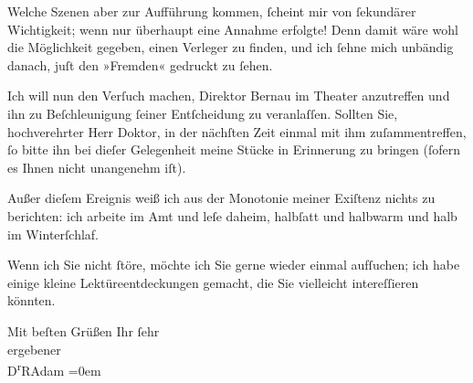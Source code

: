 \pstart
           Welche Szenen aber zur Aufführung kommen,{ }ſcheint mir von{ }ſekundärer Wichtigkeit;
               wenn nur überhaupt eine Annahme erfolgte! Denn damit wäre wohl die Möglichkeit
               gegeben, einen Verleger zu finden, und ich{ }ſehne mich unbändig danach, juſt den »Fremden« gedruckt zu{ }ſehen.\pend
           
\pstart
           Ich will nun den Verſuch machen, Direktor Bernau im Theater anzu{\pb}treffen
               und ihn zu Beſchleunigung{ }ſeiner Entſcheidung zu veranlaſſen. Sollten Sie,
               hochverehrter Herr Doktor, in der nächſten Zeit einmal mit ihm zuſammentreffen,{ }ſo
               bitte ihn bei dieſer Gelegenheit meine Stücke in Erinnerung zu bringen (ſofern es
               Ihnen nicht unangenehm iſt).\pend
           
\pstart
           Außer dieſem Ereignis weiß ich aus der Monotonie meiner Exiſtenz nichts zu berichten:
               ich arbeite im Amt und leſe daheim, halbſatt und halbwarm und halb im
               Winterſchlaf.\pend
           
\pstart
           Wenn ich Sie nicht{ }ſtöre, möchte ich Sie gerne wieder einmal aufſuchen; ich habe
               einige kleine Lektüreentdeckungen gemacht, die Sie vielleicht intereſſieren
               könnten.\pend
           
\pstart
           Mit beſten Grüßen Ihr{ }ſehr{\\[\baselineskip]}ergebener{\\[\baselineskip]}\spacefill\mbox{D\textsuperscript{r}RAdam}\pend
           \leftskip=0em{}\endnumbering{}  \newcommand{\dateiname}{L02319}\newcommand{\titel}{Robert Adam an Arthur Schnitzler, 17. 1. 1919}\newcommand{\editorInnen}{Martin Anton Müller und Gerd-Hermann Susen}
